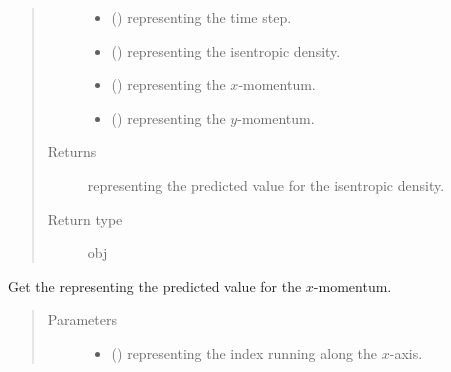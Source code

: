 \documentclass[letterpaper,10pt,english]{sphinxmanual}
\begin{document}
\begin{fulllineitems}
\begin{fulllineitems}
\begin{quote}
\begin{description}
\begin{itemize}
\item {} 
 () \textendash{}  representing the time step.

\item {} 
 () \textendash{}  representing the isentropic density.

\item {} 
 () \textendash{}  representing the \(x\)-momentum.

\item {} 
 () \textendash{}  representing the \(y\)-momentum.

\end{itemize}

\item[{Returns}] \leavevmode
{} representing the predicted value for the isentropic density.

\item[{Return type}] \leavevmode
obj

\end{description}\end{quote}

\end{fulllineitems}


\begin{fulllineitems}
\label{\detokenize{api:dycore.flux_isentropic.FluxIsentropicMacCormack._get_maccormack_predicted_value_momentum_x}}
Get the  representing the predicted value for the \(x\)-momentum.
\begin{quote}\begin{description}
\item[{Parameters}] \leavevmode\begin{itemize}
\item {} 
 () \textendash{}  representing the index running along the \(x\)-axis.


\end{itemize}
\end{description}
\end{quote}
\end{fulllineitems}
\end{fulllineitems}
\end{document}
